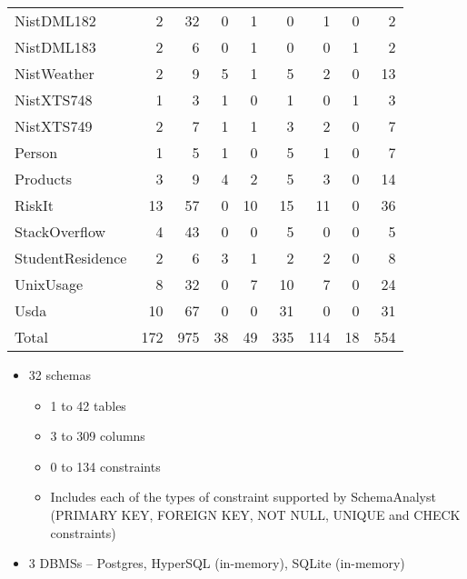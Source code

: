 \begin{table}[t!]
{\begin{tabular}{l@{\hskip -5pt}rrrrrrrr}
				NistDML182 & 2 & 32 & 0 & 1 & 0 & 1 & 0 & 2 \\
				NistDML183 & 2 & 6 & 0 & 1 & 0 & 0 & 1 & 2 \\
				NistWeather & 2 & 9 & 5 & 1 & 5 & 2 & 0 & 13 \\
				NistXTS748 & 1 & 3 & 1 & 0 & 1 & 0 & 1 & 3 \\
				NistXTS749 & 2 & 7 & 1 & 1 & 3 & 2 & 0 & 7 \\
				Person & 1 & 5 & 1 & 0 & 5 & 1 & 0 & 7 \\
				Products & 3 & 9 & 4 & 2 & 5 & 3 & 0 & 14 \\
				RiskIt & 13 & 57 & 0 & 10 & 15 & 11 & 0 & 36 \\
				StackOverflow & 4 & 43 & 0 & 0 & 5 & 0 & 0 & 5 \\
				StudentResidence & 2 & 6 & 3 & 1 & 2 & 2 & 0 & 8 \\
				UnixUsage & 8 & 32 & 0 & 7 & 10 & 7 & 0 & 24 \\
				Usda & 10 & 67 & 0 & 0 & 31 & 0 & 0 & 31 \\
				\hline
				{Total} & 172 & 975 & 38 & 49 & 335 & 114 & 18 & 554 \\
				\hline

			\end{tabular}
		}
	\end{table}

	\begin{itemize}
		\item 32 schemas
		\begin{itemize}
			\item 1 to 42 tables
			\item 3 to 309 columns
			\item 0 to 134 constraints
			\item Includes each of the types of constraint supported by SchemaAnalyst (PRIMARY KEY, FOREIGN KEY, NOT NULL, UNIQUE and CHECK constraints)
		\end{itemize}
		\item 3 DBMSs – Postgres, HyperSQL (in-memory), SQLite (in-memory)

	\end{itemize}
